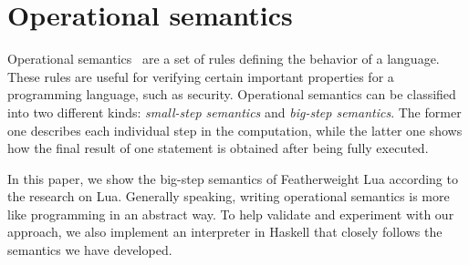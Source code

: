 \section{Operational semantics}
Operational semantics~\cite{AIOS} are a set of rules defining the behavior of a language.
These rules are useful for verifying certain important properties for a programming language, such as security.
Operational semantics can be classified into two different kinds: \emph{small-step semantics} and \emph{big-step semantics}. The former one describes each individual step in the computation, while the latter one shows how the final result of one statement is obtained after being fully executed.

In this paper, we show the big-step semantics of Featherweight Lua according to the research on Lua. Generally speaking, writing operational semantics is more like programming in an abstract way. To help validate and experiment with our approach, we also implement an interpreter in Haskell that closely follows the semantics we have developed.




